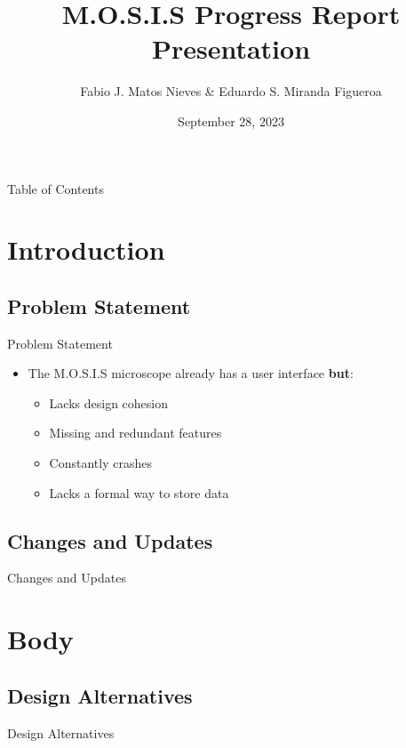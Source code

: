 \documentclass[17pt, aspectratio=169]{beamer}
\title{M.O.S.I.S Progress Report Presentation}
\author{Fabio J. Matos Nieves \& Eduardo S. Miranda Figueroa}
\institute{University of Puerto Rico Mayagüez Campus}
\date{September 28, 2023}
\begin{document}
\begin{frame}
	\maketitle
\end{frame}
\begin{frame}{Table of Contents}
	\begin{multicols}{2}
		\begin{spacing}{0.8}
			\tableofcontents
		\end{spacing}
	\end{multicols}
\end{frame}
\section{Introduction}
\subsection{Problem Statement}
\begin{frame}{Problem Statement}
	\begin{itemize}
		\item The M.O.S.I.S microscope already has a user interface \textbf{but}:
		      \begin{itemize}
			      \item Lacks design cohesion
			      \item Missing and redundant features
			      \item Constantly crashes
			      \item Lacks a formal way to store data
		      \end{itemize}
	\end{itemize}
\end{frame}
\subsection{Changes and Updates}
\begin{frame}{Changes and Updates}

\end{frame}
\section{Body}
\subsection{Design Alternatives}
\begin{frame}{Design Alternatives}
\end{frame}
\end{document}
